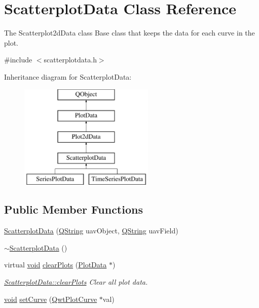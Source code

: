 \hypertarget{class_scatterplot_data}{\section{Scatterplot\-Data Class Reference}
\label{class_scatterplot_data}
}


The Scatterplot2d\-Data class Base class that keeps the data for each curve in the plot.  




{\ttfamily \#include $<$scatterplotdata.\-h$>$}

Inheritance diagram for Scatterplot\-Data\-:\begin{figure}[H]
\begin{center}
\leavevmode
\includegraphics[height=5.000000cm]{class_scatterplot_data}
\end{center}
\end{figure}
\subsection*{Public Member Functions}
\begin{DoxyCompactItemize}
\item 
\hyperlink{group___scope_plugin_ga1e171be371a5e44f814dc012e182f99b}{Scatterplot\-Data} (\hyperlink{group___u_a_v_objects_plugin_gab9d252f49c333c94a72f97ce3105a32d}{Q\-String} uav\-Object, \hyperlink{group___u_a_v_objects_plugin_gab9d252f49c333c94a72f97ce3105a32d}{Q\-String} uav\-Field)
\item 
\hyperlink{group___scope_plugin_gacbf85488507f5abc08a2e018fe01c6aa}{$\sim$\-Scatterplot\-Data} ()
\item 
virtual \hyperlink{group___u_a_v_objects_plugin_ga444cf2ff3f0ecbe028adce838d373f5c}{void} \hyperlink{group___scope_plugin_gaa7f91ef4cdbbbdc7e767c24bfea06159}{clear\-Plots} (\hyperlink{class_plot_data}{Plot\-Data} $\ast$)
\begin{DoxyCompactList}\small\item\em \hyperlink{group___scope_plugin_gaa7f91ef4cdbbbdc7e767c24bfea06159}{Scatterplot\-Data\-::clear\-Plots} Clear all plot data. \end{DoxyCompactList}\item 
\hyperlink{group___u_a_v_objects_plugin_ga444cf2ff3f0ecbe028adce838d373f5c}{void} \hyperlink{group___scope_plugin_gac306ab453dd4daa43ebd0565b7f73783}{set\-Curve} (\hyperlink{class_qwt_plot_curve}{Qwt\-Plot\-Curve} $\ast$val)
\end{DoxyCompactItemize}
